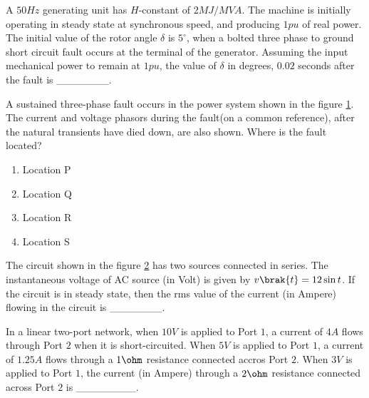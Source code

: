\iffalse
\chapter{2015}
\author{AI24BTECH11015 - Harshvardhan Patidar}
\section{ee}
\fi
    \item A $50 Hz$ generating unit has $H$-constant of $2 MJ/MVA$. The machine is initially operating in steady state at synchronous speed, and producing $1 pu$ of real power. The initial value of the rotor angle $\delta$ is $5^{\circ}$, when a bolted three phase to ground short circuit fault occurs at the terminal of the generator. Assuming the input mechanical power to remain at $1pu$, the value of $\delta$ in degrees, $0.02$ seconds after the fault is \_\_\_\_\_\_\_.

    \item A sustained three-phase fault occurs in the power system shown in the figure \ref{fig54}. The current and voltage phasors during the fault(on a common reference), after the natural transients have died down, are also shown. Where is the fault located?
    \begin{figure}[H]
        \centering
        
        \caption{}
        \label{fig54}
    \end{figure}
    \begin{enumerate}
        \item Location P
        \item Location Q
        \item Location R
        \item Location S
    \end{enumerate}

    \item The circuit shown in the figure \ref{fig55} has two sources connected in series. The instantaneous voltage of AC source (in Volt) is given by $v\brak{t} = 12 \sin t$. If the circuit is in steady state, then the rms value of the current (in Ampere) flowing in the circuit is \_\_\_\_\_\_\_.
    \begin{figure}[H]
        \centering
        
        \caption{}
        \label{fig55}
    \end{figure}

    \item In a linear two-port network, when $10V$ is applied to Port $1$, a current of $4A$ flows through Port $2$ when it is short-circuited. When $5V$ is applied to Port $1$, a current of $1.25A$ flows through a $1 \ohm$ resistance connected accros Port $2$. When $3V$ is applied to Port $1$, the current (in Ampere) through a $2 \ohm$ resistance connected across Port $2$ is \_\_\_\_\_\_\_\_.

